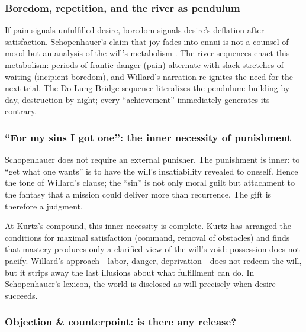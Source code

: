 \subsubsection*{Boredom, repetition, and the river as pendulum}

If pain signals unfulfilled desire, boredom signals desire's deflation after satisfaction.
Schopenhauer's claim that joy fades into ennui is not a counsel of mood but an analysis
of the will's metabolism \parencite[pp.~312--320]{SchopenhauerWWR1969}. The
\hyperref[scene:upriver-journey]{river sequences} enact this metabolism: periods of frantic
danger (pain) alternate with slack stretches of waiting (incipient boredom), and Willard's
narration re-ignites the need for the next trial.
The \hyperref[scene:do-lung-bridge]{Do Lung Bridge} sequence literalizes the pendulum:
building by day, destruction by night; every ``achievement'' immediately generates its
contrary.

\subsubsection*{``For my sins I got one'': the inner necessity of punishment}

Schopenhauer does not require an external punisher. The punishment is inner: to ``get what one
wants'' is to have the will's insatiability revealed to oneself. Hence the tone of Willard's
clause; the ``sin'' is not only moral guilt but attachment to the fantasy that a mission could
deliver more than recurrence. The gift is therefore a judgment.

At \hyperref[scene:kurtz-compound]{Kurtz's compound}, this inner necessity is complete. Kurtz
has arranged the conditions for maximal satisfaction (command, removal of obstacles) and finds
that mastery produces only a
clarified view of the will's void: possession does not pacify. Willard's approach—labor, danger,
deprivation—does not redeem the will, but it strips away the last illusions about what
fulfillment can do. In Schopenhauer's lexicon, the world is disclosed as will precisely when
desire succeeds.

\subsubsection*{Objection \& counterpoint: is there any release?}

